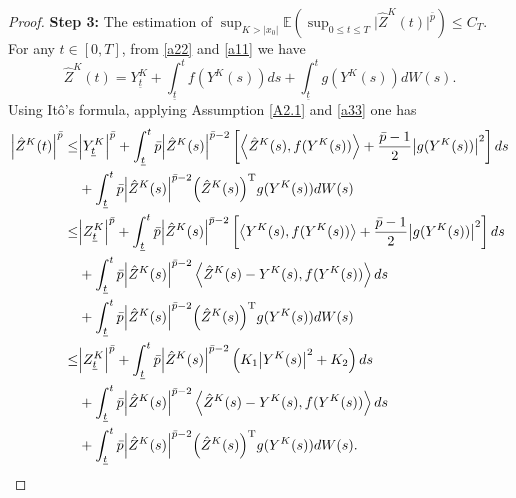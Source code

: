 \documentclass[preprint,12pt,compress]{elsarticle}
\begin{document}
\begin{proof}
\textbf{Step 3:} The estimation of ${\sup _{K > |{x_0}|}}\mathbb{E}({\sup _{0 \le t \le T}}|{{\hat Z}^K}(t){|^{\bar p}}) \le {C_T}$.
For any $t \in [0, T]$, from \eqref{a22} and \eqref{a11} we have
\begin{equation*}
	{{\hat{Z}}^K}(t) = Y_{\underline{t}}^K + \int_{\underline{t}}^t {f({{Y}^K}(s))ds}  + \int_{\underline{t}}^t {g({{Y}^K}(s))dW(s)} .
\end{equation*}
Using It\^o's formula, applying Assumption \ref{A2.1} and \eqref{a33} one has
\begin{equation}  \label{a31}
	\begin{split}
		{\left| {{{\hat{Z}}^K}(t)} \right|^{\bar p}} \le& {\left| {Y_{\underline{t}}^K} \right|^{\bar p}} + \int_{\underline{t}}^t {{\bar p}{{\left| {{{\hat{Z}}^K}(s)} \right|}^{{\bar p} - 2}}\left[ {\left\langle {{{\hat{Z}}^K}(s),f({{Y}^K}(s))} \right\rangle  + \frac{{{\bar p} - 1}}{2}{{\left| {g({{Y}^K}(s))} \right|}^2}} \right]ds} \\
		&+ \int_{\underline{t}}^t {\bar p{{\left| {{{\hat Z}^K}(s)} \right|}^{\bar p - 2}}{{\left( {{{\hat Z}^K}(s)} \right)}^{\rm T}}g({Y^K}(s))dW(s)}  \\
		\le& {\left| {Z_{\underline{t}}^K} \right|^{\bar p}} + \int_{\underline{t}}^t {{\bar p}{{\left| {{{\hat{Z}}^K}(s)} \right|}^{{\bar p} - 2}}\left[ {\left\langle {{{Y}^K}(s),f({{Y}^K}(s))} \right\rangle  + \frac{{{\bar p} - 1}}{2}{{\left| {g({{Y}^K}(s))} \right|}^2}} \right]ds} \\
		&+ \int_{\underline{t}}^t {{\bar p}{{\left| {{{\hat{Z}}^K}(s)} \right|}^{{\bar p} - 2}}\left\langle {{{\hat{Z}}^K}(s) - {{Y}^K}(s),f({{Y}^K}(s))} \right\rangle ds} \\
		&+ \int_{\underline{t}}^t {\bar p{{\left| {{{\hat Z}^K}(s)} \right|}^{\bar p - 2}}{{\left( {{{\hat Z}^K}(s)} \right)}^{\rm T}}g({Y^K}(s))dW(s)} \\
		\le& {\left| {Z_{\underline{t}}^K} \right|^{\bar p}} + \int_{\underline{t}}^t {\bar p}{{{\left| {{{\hat{Z}}^K}(s)} \right|}^{{\bar p} - 2}}\left( {K_1 {{\left| {{{Y}^K}(s)} \right|}^2} + K_2 } \right)ds}  \\
		&+ \int_{\underline{t}}^t {{\bar p}{{\left| {{{\hat{Z}}^K}(s)} \right|}^{{\bar p} - 2}}\left\langle {{{\hat{Z}}^K}(s) - {{Y}^K}(s),f({{Y}^K}(s))} \right\rangle ds} \\
		&+ \int_{\underline{t}}^t {\bar p{{\left| {{{\hat Z}^K}(s)} \right|}^{\bar p - 2}}{{\left( {{{\hat Z}^K}(s)} \right)}^{\rm T}}g({Y^K}(s))dW(s)}.
	\end{split}
\end{equation}

\end{proof}
\end{document}
